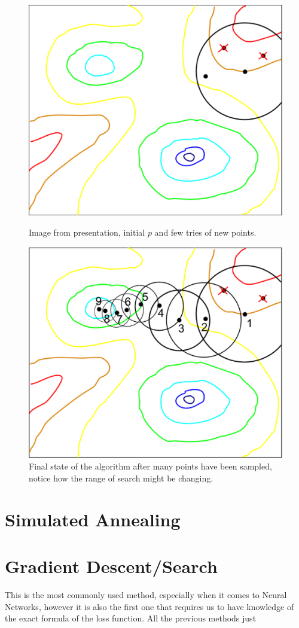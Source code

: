 \documentclass{article}
\begin{document}
\begin{figure}[h]
    \centering
    \begin{minipage}{0.4\textwidth}
        \centering
        \includegraphics[width=\linewidth]{../images/screenshot1.png}
        \caption{Image from presentation, initial $p$ and few tries of new points.}
    \end{minipage}
    \hfill
    \begin{minipage}{0.4\textwidth}
        \centering
        \includegraphics[width=\linewidth]{../images/screenshot2.png}
        \caption{Final state of the algorithm after many points have been sampled, notice how the range of search might be changing.}
    \end{minipage}
\end{figure}

\section{Simulated Annealing}

\section{Gradient Descent/Search}

This is the most commonly used method, especially when it comes to Neural Networks, however it is also the first one that requires us to have knowledge of the exact formula of the loss function. All the previous methods just 
\end{document}
